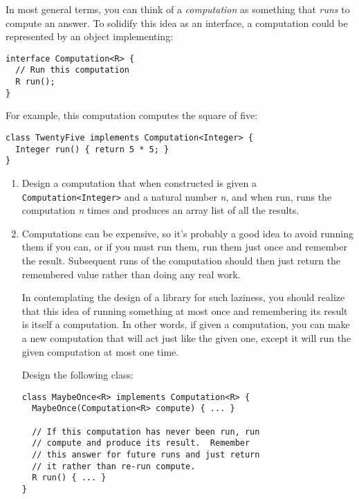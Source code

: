 \documentclass[12pt]{article}                   %
\def\pts#1{\marginpar{\footnotesize \raggedright  \fbox{#1 {\sc Points}}}}
\begin{document}
\begin{problem} \pts{18}

In most general terms, you can think of a \emph{computation} as something that
\emph{runs} to compute an answer.  To solidify this idea as an interface, a
computation could be represented by an object implementing:

\begin{verbatim}
interface Computation<R> {
  // Run this computation
  R run();
}
\end{verbatim}

\noindent
For example, this computation computes the square of five:

\begin{verbatim}
class TwentyFive implements Computation<Integer> {
  Integer run() { return 5 * 5; }
}
\end{verbatim}

\begin{enumerate}

\item Design a computation that when constructed is given a
 \texttt{Computation<Integer>} and a natural number \emph{n}, and when
 run, runs the computation \emph{n} times and produces an array list
of all the results.

\newpage
\item

Computations can be expensive, so it's probably a good idea to avoid
 running them if you can, or if you must run them, run them just once
 and remember the result. Subsequent runs of the computation should
 then just return the remembered value rather than doing any real
 work.

In contemplating the design of a library for such laziness, you should
 realize that this idea of running something at most once and
 remembering its result is itself a computation.  In other words, if
 given a computation, you can make a new computation that will act
 just like the given one, except it will run the given computation at
 most one time.

Design the following class:

\begin{verbatim}
class MaybeOnce<R> implements Computation<R> {
  MaybeOnce(Computation<R> compute) { ... }

  // If this computation has never been run, run
  // compute and produce its result.  Remember
  // this answer for future runs and just return
  // it rather than re-run compute.
  R run() { ... }
}
\end{verbatim}


\end{enumerate}
\end{problem}
\end{document}
